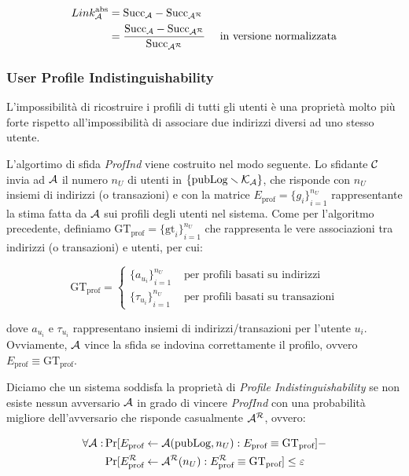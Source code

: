 \[ \begin{aligned} Link^{\text{abs}}_{\mathcal{A}} &= \text{Succ}_{\mathcal{A}} - \text{Succ}_{\mathcal{A}^\mathcal{R}} \\
   &= \frac{\text{Succ}_{\mathcal{A}} - \text{Succ}_{\mathcal{A}^\mathcal{R}}}{\text{Succ}_{\mathcal{A}^\mathcal{R}}} \quad \text{ in versione normalizzata}
   \end{aligned}\]

\subsubsection{User Profile Indistinguishability}\label{profile-indistinguishability}

L'impossibilità di ricostruire i profili di tutti gli utenti è una proprietà molto più forte rispetto all'impossibilità di associare due indirizzi diversi ad uno stesso utente.

L'algortimo di sfida \emph{ProfInd}\label{profind_alg} viene costruito nel modo seguente.
Lo sfidante $\mathcal{C}$ invia ad $\mathcal{A}$ il numero $n_U$ di utenti in $\{\text{pubLog} \smallsetminus \mathcal{K}_\mathcal{A}\}$, che risponde con $n_U$ insiemi di indirizzi (o transazioni) e con la matrice $E_\text{prof} = {\{g_i\}}^{n_U}_{i=1}$ rappresentante la stima fatta da $\mathcal{A}$ sui profili degli utenti nel sistema.
Come per l'algoritmo precedente, definiamo $\text{GT}_\text{prof} = {\{\text{gt}_i\}}^{n_U}_{i=1}$ che rappresenta le vere associazioni tra indirizzi (o transazioni) e utenti, per cui:

\[
	\text{GT}_\text{prof} = \begin{cases}
		{\{a_{u_i}\}}^{n_U}_{i=1} &\text{ per profili basati su indirizzi} \\
		{\{\tau_{u_i}\}}^{n_U}_{i=1} &\text{ per profili basati su transazioni}
	\end{cases}
\]

dove $a_{u_i}$ e $\tau_{u_i}$ rappresentano insiemi di indirizzi/transazioni per l'utente $u_i$.
Ovviamente, $\mathcal{A}$ vince la sfida se indovina correttamente il profilo, ovvero $E_\text{prof} \equiv \text{GT}_\text{prof}$.



Diciamo che un sistema soddisfa la proprietà di \emph{Profile Indistinguishability} se non esiste nessun avversario $\mathcal{A}$ in grado di vincere \emph{ProfInd} con una probabilità migliore dell'avversario che risponde casualmente $\mathcal{A}^\mathcal{R}$, ovvero:

\[
	\begin{aligned}
		\forall \mathcal{A}: &\Pr [E_\text{prof} \leftarrow \mathcal{A}(\text{pubLog}, n_U): E_\text{prof} \equiv \text{GT}_\text{prof}] - \\
		&\Pr [ E^\mathcal{R}_\text{prof} \leftarrow \mathcal{A}^\mathcal{R}(n_U) : E^\mathcal{R}_\text{prof} \equiv \text{GT}_\text{prof} ] \leq \varepsilon
	\end{aligned}
\]

